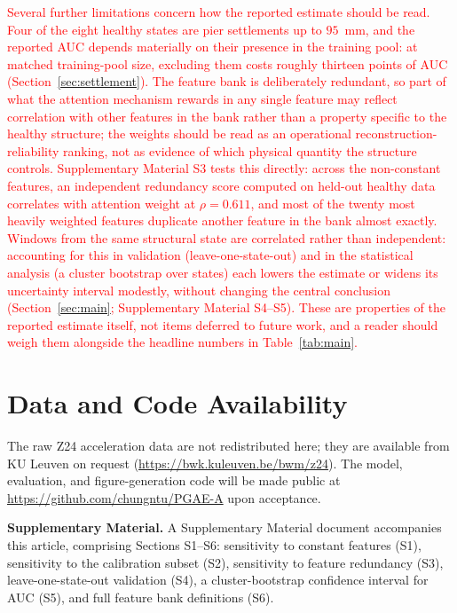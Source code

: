 \documentclass[11pt,a4paper]{article}
\begin{document}
\textcolor{red}{Several further limitations concern how the reported estimate
should be read. Four of the eight healthy states are pier settlements up to
$95$~mm, and the reported AUC depends materially on their presence in the
training pool: at matched training-pool size, excluding them costs roughly
thirteen points of AUC (Section~\ref{sec:settlement}). The feature bank is
deliberately redundant, so part of what the attention mechanism rewards in
any single feature may reflect correlation with other features in the bank
rather than a property specific to the healthy structure; the weights should
be read as an operational reconstruction-reliability ranking, not as
evidence of which physical quantity the structure controls. Supplementary
Material S3 tests this directly: across the non-constant features, an
independent redundancy score computed on held-out healthy data correlates
with attention weight at $\rho=0.611$, and most of the twenty most heavily
weighted features duplicate another feature in the bank almost exactly.
Windows from the
same structural state are correlated rather than independent: accounting
for this in validation (leave-one-state-out) and in the statistical analysis
(a cluster bootstrap over states) each lowers the estimate or widens its
uncertainty interval modestly, without changing the central conclusion
(Section~\ref{sec:main}; Supplementary Material S4--S5). These are
properties of the reported estimate itself, not items deferred to future
work, and a reader should weigh them alongside the headline numbers in
Table~\ref{tab:main}.}

\color{red}
\section*{Data and Code Availability}
The raw Z24
acceleration data are not redistributed here; they are available from KU
Leuven on request (\url{https://bwk.kuleuven.be/bwm/z24}). The model,
evaluation, and figure-generation code will be made public at
\url{https://github.com/chungntu/PGAE-A} upon acceptance.

\bigskip
\noindent\textbf{Supplementary Material.} A Supplementary Material document
accompanies this article, comprising Sections S1--S6: sensitivity to
constant features (S1), sensitivity to the calibration subset (S2),
sensitivity to feature redundancy (S3), leave-one-state-out validation
(S4), a cluster-bootstrap confidence interval for AUC (S5), and full
feature bank definitions (S6).
\color{black}
\end{document}
